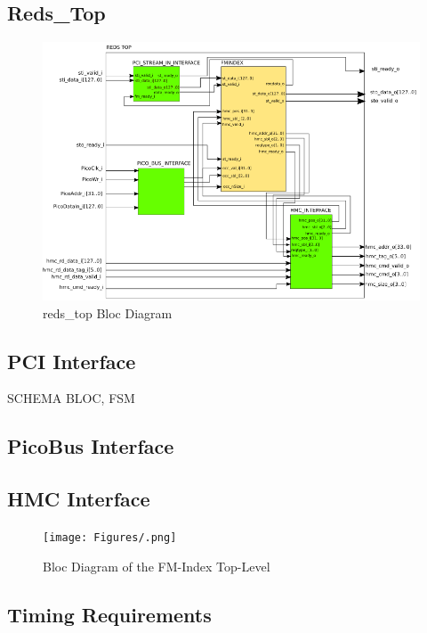 \subsection{Reds\_Top}
\begin{figure}[H]
    \centering
    \includegraphics[scale = 0.55]{Figures/REDS_TOP_DIAG.png}
    \caption{reds\_top Bloc Diagram}
    \label{fig:reds_top_diag}
\end{figure}

\subsection{PCI Interface}

SCHEMA BLOC, FSM

\subsection{PicoBus Interface}

\subsection{HMC Interface}

\begin{figure}[H]
    \centering
    \hspace*{-20mm}\texttt{[image: Figures/.png]}
    \caption{Bloc Diagram of the FM-Index Top-Level}
    \label{fig:seqschema}
\end{figure}

\subsection{Timing Requirements}

